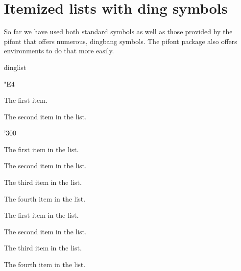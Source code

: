 %
%
%


\section{Itemized lists with ding symbols}

So far we have used both standard symbols as well as those provided by the pifont that offers numerous,
dingbang symbols. The pifont package also offers environments to do that more easily.


\begin{texexample}{dinglist}{}
\begin{dinglist}{"E4}
\item The first item. \item The second
item in the list.
\end{dinglist}
\end{texexample}

\begin{dingautolist}{'300}
\item The first item in the list.\label{lst:a}
\item The second item in the list.\label{lst:b}
\item The third item in the list.\label{lst:c}
\item The fourth item in the list.\label{lst:d}
\end{dingautolist}

\newenvironment{steps}{}{\enddingautolist}

\begin{steps}
\item The first item in the list.\label{lst:a}
\item The second item in the list.\label{lst:b}
\item The third item in the list.\label{lst:c}
\item The fourth item in the list.\label{lst:d}
\end{steps}

\makeatother
\endgroup
